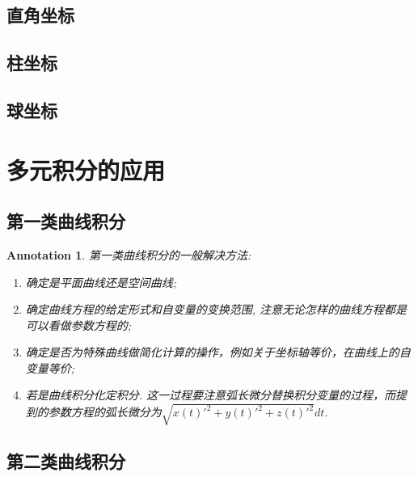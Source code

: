 \documentclass{article}
\newtheorem{annotation}[theorem]{Annotation}
\begin{document}
\subsection{直角坐标}

\subsection{柱坐标}

\subsection{球坐标}


\newpage
\section{多元积分的应用}

\subsection{第一类曲线积分}

\begin{annotation}
\rm 第一类曲线积分的一般解决方法:
\begin{enumerate}
	\item 确定是平面曲线还是空间曲线;
	\item 确定曲线方程的给定形式和自变量的变换范围, 注意无论怎样的曲线方程都是可以看做参数方程的;
	\item 确定是否为特殊曲线做简化计算的操作，例如关于坐标轴等价，在曲线上的自变量等价;
	\item 若是曲线积分化定积分. 这一过程要注意弧长微分替换积分变量的过程，而提到的参数方程的弧长微分为$\sqrt{x(t)'^2 + y(t)'^2 + z(t)'^2}dt$.  
\end{enumerate}
\end{annotation}

\subsection{第二类曲线积分}
\end{document}
